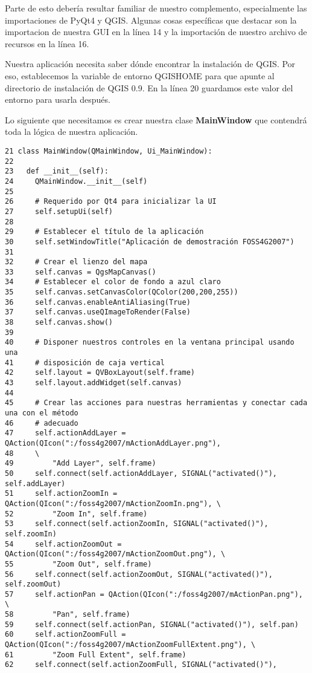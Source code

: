 Parte de esto debería resultar familiar de nuestro complemento, especialmente las importaciones de PyQt4 y
QGIS. Algunas cosas específicas que destacar son la importacion de nuestra GUI en la línea 14 y la
importación de nuestro archivo de recursos en la línea 16.

Nuestra aplicación necesita saber dónde encontrar la instalación de QGIS. Por eso, establecemos la
variable de entorno QGISHOME para que apunte al directorio de instalación de QGIS 0.9. En la línea
20 guardamos este valor del entorno para usarla después.

Lo siguiente que necesitamos es crear nuestra clase \textbf{MainWindow} que contendrá toda la lógica de
nuestra aplicación.
\begin{verbatim}
21 class MainWindow(QMainWindow, Ui_MainWindow):
22 
23   def __init__(self):
24     QMainWindow.__init__(self)
25 
26     # Requerido por Qt4 para inicializar la UI
27     self.setupUi(self)
28 
29     # Establecer el título de la aplicación
30     self.setWindowTitle("Aplicación de demostración FOSS4G2007")
31 
32     # Crear el lienzo del mapa
33     self.canvas = QgsMapCanvas()
34     # Establecer el color de fondo a azul claro
35     self.canvas.setCanvasColor(QColor(200,200,255))
36     self.canvas.enableAntiAliasing(True)
37     self.canvas.useQImageToRender(False)
38     self.canvas.show()
39 
40     # Disponer nuestros controles en la ventana principal usando una 
41     # disposición de caja vertical
42     self.layout = QVBoxLayout(self.frame)
43     self.layout.addWidget(self.canvas)
44 
45     # Crear las acciones para nuestras herramientas y conectar cada una con el método
46     # adecuado
47     self.actionAddLayer = QAction(QIcon(":/foss4g2007/mActionAddLayer.png"),
48     \
49         "Add Layer", self.frame)
50     self.connect(self.actionAddLayer, SIGNAL("activated()"), self.addLayer)
51     self.actionZoomIn = QAction(QIcon(":/foss4g2007/mActionZoomIn.png"), \
52         "Zoom In", self.frame)
53     self.connect(self.actionZoomIn, SIGNAL("activated()"), self.zoomIn)
54     self.actionZoomOut = QAction(QIcon(":/foss4g2007/mActionZoomOut.png"), \
55         "Zoom Out", self.frame)
56     self.connect(self.actionZoomOut, SIGNAL("activated()"), self.zoomOut)
57     self.actionPan = QAction(QIcon(":/foss4g2007/mActionPan.png"), \
58         "Pan", self.frame)
59     self.connect(self.actionPan, SIGNAL("activated()"), self.pan)
60     self.actionZoomFull = QAction(QIcon(":/foss4g2007/mActionZoomFullExtent.png"), \
61         "Zoom Full Extent", self.frame)
62     self.connect(self.actionZoomFull, SIGNAL("activated()"),

\end{verbatim}
